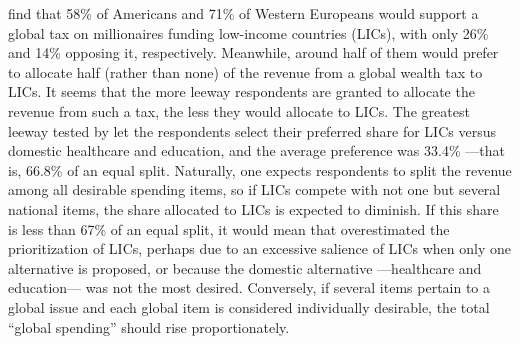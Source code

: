 \documentclass[12pt,english]{article}
\begin{document}
\begin{bibunit}
\cite{fabre_majority_2025} find that 58\% of Americans and 71\% of Western Europeans would support a global tax on millionaires funding low-income countries (LICs), with only 26\% and 14\% opposing it, respectively. Meanwhile, around half of them would prefer to allocate half (rather than none) of the revenue from a global wealth tax to LICs.  
It seems that the more leeway respondents are granted to allocate the revenue from such a tax, the less they would allocate to LICs. 
The greatest leeway tested by \cite{fabre_majority_2025} let the respondents select their preferred share for LICs versus domestic healthcare and education, %
and the average preference was 33.4\% ---that is, 66.8\% of an equal split. %
Naturally, one expects respondents to split the revenue among all desirable spending items, so %
if LICs compete with not one but several national items, the share allocated to LICs is expected to diminish. 
If this share is less than 67\% of an equal split, it would mean that \cite{fabre_majority_2025} overestimated the prioritization of LICs, perhaps due to an excessive salience of LICs when only one alternative is proposed, or because the domestic alternative ---healthcare and education--- was not the most desired. %
Conversely, if several items pertain to a global issue and each global item is considered individually desirable, the total ``global spending'' should rise proportionately. 


\end{bibunit}
\end{document}
